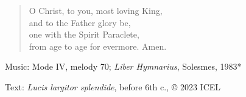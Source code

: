 \hymn



\setlength{\leftmargini}{2em}
\begin{verse}
  O Christ, to you, most loving King,\\ 
  and to the Father glory be,\\ 
  one with the Spirit Paraclete,\\
  from age to age for evermore. Amen.
\end{verse}
\setlength{\leftmargini}{\defleftmargini}

\begin{hymnsource}
Music: Mode IV, melody 70; \emph{Liber Hymnarius}, Solesmes, 1983*

Text: \emph{Lucis largitor splendide}, before 6th c., © 2023 ICEL
\end{hymnsource}

